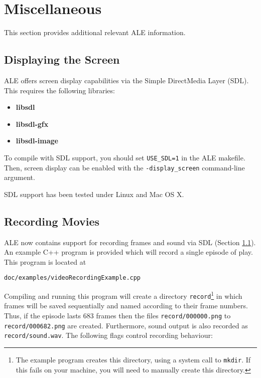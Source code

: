 \documentclass[12pt]{article}
\begin{document}
\section{Miscellaneous}

This section provides additional relevant ALE information.

\subsection{Displaying the Screen}\label{subsec:displaying_screen}

ALE offers screen display capabilities via the Simple DirectMedia Layer (SDL). This requires
the following libraries:

\begin{itemize}
  \item{\textbf{libsdl}}
  \item{\textbf{libsdl-gfx}}
  \item{\textbf{libsdl-image}}
\end{itemize}

To compile with SDL support, you should set \verb+USE_SDL=1+ in the ALE makefile. Then, screen
display can be enabled with the \verb+-display_screen+ command-line argument. 

SDL support has been tested under Linux and Mac OS X. 

\subsection{Recording Movies}

ALE now contains support for recording frames and sound via SDL (Section \ref{subsec:displaying_screen}).
An example C++ program is provided which will record a single episode of play. This program is located at

\begin{center}
\texttt{doc/examples/videoRecordingExample.cpp}
\end{center}

Compiling and running this program will create a directory \texttt{record}\footnote{The example program creates this directory, using a system call to \texttt{mkdir}. If this fails on your machine, you will need to manually create this directory.} in which frames will be saved sequentially and named according to their frame numbers. Thus, if the episode lasts 683 frames then the files \verb+record/000000.png+ to \verb+record/000682.png+ are created. Furthermore, sound output is also recorded as \verb+record/sound.wav+. The following flags control recording behaviour:
\end{document}
